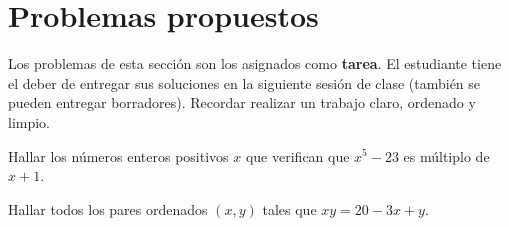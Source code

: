 \section{Problemas propuestos}

Los problemas de esta sección son los asignados como \textbf{tarea}.
El estudiante tiene el deber de entregar sus soluciones en la siguiente sesión de clase (también se pueden entregar borradores).
Recordar realizar un trabajo claro, ordenado y limpio.

\begin{exercise}
    Hallar los números enteros positivos $x$ que verifican que $x^5 - 23$ es múltiplo de $x + 1$.
\end{exercise}

\begin{exercise}
    Hallar todos los pares ordenados $(x,y)$ tales que $xy = 20 - 3x + y$.
\end{exercise}
